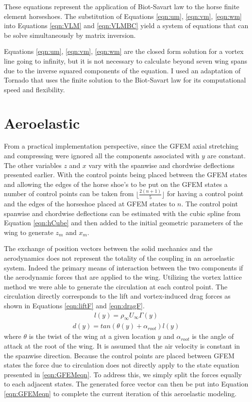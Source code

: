 \documentclass[11pt]{ucthesis}
\begin{document}
These equations represent the application of Biot-Savart law to the horse finite element horseshoes. The substitution of Equations \ref{eqn:um}, \ref{eqn:vm}, \ref{eqn:wm} into Equations \ref{eqn:VLM} and \ref{eqn:VLMBC} yield a system of equations that can be solve simultaneously by matrix inversion. 

Equations \ref{eqn:um}, \ref{eqn:vm}, \ref{eqn:wm} are the closed form solution for a vortex line going to infinity, but it is not necessary to calculate beyond seven wing spans due to the inverse squared components of the equation. I used an adaptation of Tornado that uses the finite solution to the Biot-Savart law for its computational speed and flexibility.\cite{melin2000vortex}

\section{Aeroelastic}
From a practical implementation perspective, since the GFEM axial stretching and compressing were ignored all the components associated with $y$ are constant. The other variables $z$ and $x$ vary with the spanwise and chordwise deflections presented earlier. With the control points being placed between the GFEM states and allowing the edges of the horse shoe's to be put on the GFEM states a number of control points can be taken from $\lfloor \frac{2(n+1)}{5}\rfloor$ for having a control point and the edges of the horseshoe placed at GFEM states to $n$. The control point spanwise and chordwise deflections can be estimated with the cubic spline from Equation \ref{eqn:hCube} and then added to the initial geometric parameters of the wing to generate $z_m$ and $x_m$.

The exchange of position vectors between the solid mechanics and the aerodynamics does not represent the totality of the coupling in an aeroelastic system. Indeed the primary means of interaction between the two components if the aerodynamic forces that are applied to the wing. Utilizing the vortex lattice method we were able to generate the circulation at each control point. The circulation directly corresponds to the lift and vortex-induced drag forces as shown in Equations \ref{eqn:liftF} and \ref{eqn:dragF}.
\begin{eqnarray}
l(y) = \rho_{\infty}U_{\infty}\Gamma(y)
\label{eqn:liftF}
\end{eqnarray}
\begin{eqnarray}
d(y) = tan(\theta(y)+\alpha_{root})l(y)
\label{eqn:dragF}
\end{eqnarray}
where $\theta$ is the twist of the wing at a given location $y$ and $\alpha_{root}$ is the angle of attack at the root of the wing. It is assumed that the air velocity is constant in the spanwise direction. Because the control points are placed between GFEM states the force due to circulation does not directly apply to the state equation presented in \ref{eqn:GFEMeqn}. To address this, we simply split the forces equally to each adjacent states. The generated force vector can then be put into Equation \ref{eqn:GFEMeqn} to complete the current iteration of this aeroelastic modeling.
\end{document}
